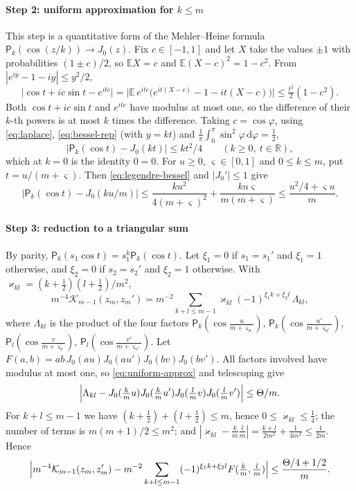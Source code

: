 \documentclass[preprint,12pt,a4paper]{elsarticle}
\theoremstyle{remark}
\newcommand{\R}{\mathbb R}
\newcommand{\dd}{\,\mathrm d}
\begin{document}
\paragraph{Step 2: uniform approximation for $k\le m$}
This step is a quantitative form of the Mehler--Heine formula
$\mathsf P_k(\cos(z/k))\to J_0(z)$.
Fix $c\in[-1,1]$ and let $X$ take the values $\pm1$ with probabilities
$(1\pm c)/2$, so $\mathbb EX=c$ and $\mathbb E(X-c)^2=1-c^2$. From
$|e^{iy}-1-iy|\le y^2/2$,
\[
 \bigl|\cos t+ic\sin t-e^{itc}\bigr|=\bigl|\mathbb E\,e^{itc}\bigl(e^{it(X-c)}-1-it(X-c)\bigr)\bigr|
 \le\tfrac{t^2}2(1-c^2).
\]
Both $\cos t+ic\sin t$ and $e^{itc}$ have modulus at most one, so the difference
of their $k$-th powers is at most $k$ times the difference. Taking
$c=\cos\varphi$, using \eqref{eq:laplace}, \eqref{eq:bessel-rep} (with $y=kt$) and
$\frac1\pi\int_0^\pi\sin^2\varphi\dd\varphi=\frac12$,
\begin{equation}\label{eq:legendre-bessel}
 |\mathsf P_k(\cos t)-J_0(kt)|\le kt^2/4\qquad(k\ge0,\ t\in\R),
\end{equation}
which at $k=0$ is the identity $0=0$. For $u\ge0$, $\varsigma\in[0,1]$ and
$0\le k\le m$, put $t=u/(m+\varsigma)$. Then \eqref{eq:legendre-bessel} and
$|J_0'|\le1$ give
\begin{equation}\label{eq:uniform-approx}
 \bigl|\mathsf P_k(\cos t)-J_0(ku/m)\bigr|\le\frac{ku^2}{4(m+\varsigma)^2}
 +\frac{ku\varsigma}{m(m+\varsigma)}\le\frac{u^2/4+\varsigma u}m .
\end{equation}

\paragraph{Step 3: reduction to a triangular sum}
By parity, $\mathsf P_k(s_1\cos t)=s_1^k\mathsf P_k(\cos t)$. Let $\xi_1=0$ if
$s_1=s_1'$ and $\xi_1=1$ otherwise, and $\xi_2=0$ if $s_2=s_2'$ and $\xi_2=1$
otherwise. With $\varkappa_{kl}=(k+\frac12)(l+\frac12)/m^2$,
\[
 m^{-4}\mathcal K_{m-1}(z_m,z_m')=m^{-2}\sum_{k+l\le m-1}\varkappa_{kl}(-1)^{\xi_1 k+\xi_2 l}\,
 \Lambda_{kl},
\]
where $\Lambda_{kl}$ is the product of the four factors
$\mathsf P_k(\cos\frac u{m+\varsigma_u})$, $\mathsf P_k(\cos\frac{u'}{m+\varsigma_{u'}})$,
$\mathsf P_l(\cos\frac v{m+\varsigma_v})$, $\mathsf P_l(\cos\frac{v'}{m+\varsigma_{v'}})$.
Let $F(a,b)=ab\,J_0(au)J_0(au')J_0(bv)J_0(bv')$. All factors involved have
modulus at most one, so \eqref{eq:uniform-approx} and telescoping give
\[
 \Bigl|\Lambda_{kl}-J_0(\tfrac kmu)J_0(\tfrac kmu')J_0(\tfrac lmv)J_0(\tfrac lmv')\Bigr|
 \le\Theta/m .
\]
For $k+l\le m-1$ we have $(k+\frac12)+(l+\frac12)\le m$, hence
$0\le \varkappa_{kl}\le\frac14$; the number of terms is $m(m+1)/2\le m^2$; and
$|\varkappa_{kl}-\frac km\frac lm|=\frac{k+l}{2m^2}+\frac1{4m^2}\le\frac1{2m}$. Hence
\begin{equation}\label{eq:kernel-reduction}
 \Bigl|m^{-4}\mathcal K_{m-1}(z_m,z_m')-m^{-2}\sum_{k+l\le m-1}(-1)^{\xi_1 k+\xi_2 l}
 F(\tfrac km,\tfrac lm)\Bigr|\le\frac{\Theta/4+1/2}m .
\end{equation}
\end{document}
